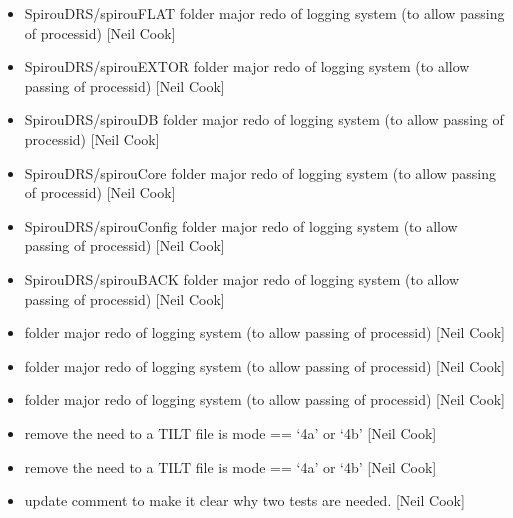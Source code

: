 \documentclass[a4paper,10pt,english]{report}
\begin{document}
\begin{itemize}
\item {} 
SpirouDRS/spirouFLAT folder \sphinxhyphen{} major redo of logging system (to allow
passing of process\sphinxhyphen{}id) {[}Neil Cook{]}

\item {} 
SpirouDRS/spirouEXTOR folder \sphinxhyphen{} major redo of logging system (to allow
passing of process\sphinxhyphen{}id) {[}Neil Cook{]}

\item {} 
SpirouDRS/spirouDB folder \sphinxhyphen{} major redo of logging system (to allow
passing of process\sphinxhyphen{}id) {[}Neil Cook{]}

\item {} 
SpirouDRS/spirouCore folder \sphinxhyphen{} major redo of logging system (to allow
passing of process\sphinxhyphen{}id) {[}Neil Cook{]}

\item {} 
SpirouDRS/spirouConfig folder \sphinxhyphen{} major redo of logging system (to allow
passing of process\sphinxhyphen{}id) {[}Neil Cook{]}

\item {} 
SpirouDRS/spirouBACK folder \sphinxhyphen{} major redo of logging system (to allow
passing of process\sphinxhyphen{}id) {[}Neil Cook{]}

\item {} 
 folder \sphinxhyphen{} major redo of logging system (to allow
passing of process\sphinxhyphen{}id) {[}Neil Cook{]}

\item {} 
 folder \sphinxhyphen{} major redo of logging system (to allow passing
of process\sphinxhyphen{}id) {[}Neil Cook{]}

\item {} 
 folder \sphinxhyphen{} major redo of logging system (to allow passing
of process\sphinxhyphen{}id) {[}Neil Cook{]}

\item {} 
 \sphinxhyphen{} remove the need to a TILT file is mode ==
‘4a’ or ‘4b’ {[}Neil Cook{]}

\item {} 
 \sphinxhyphen{} remove the need to a TILT file is mode ==
‘4a’ or ‘4b’ {[}Neil Cook{]}

\item {} 
 \sphinxhyphen{} update comment to make it clear why two tests
are needed. {[}Neil Cook{]}

\end{itemize}
\end{document}
